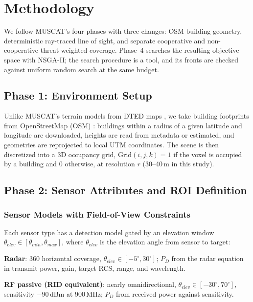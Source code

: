 
\section{Methodology}
\label{sec:methodology}

We follow MUSCAT's four phases \cite{muscat2023} with three changes: OSM building geometry, deterministic ray-traced line of sight, and separate cooperative and non-cooperative threat-weighted coverage. Phase~4 searches the resulting objective space with NSGA-II; the search procedure is a tool, and its fronts are checked against uniform random search at the same budget.

\subsection{Phase 1: Environment Setup}

Unlike MUSCAT's terrain models from DTED maps \cite{muscat2023}, we take building footprints from OpenStreetMap (OSM) \cite{osm_applications,elias2023exploring}: buildings within a radius of a given latitude and longitude are downloaded, heights are read from metadata or estimated, and geometries are reprojected to local UTM coordinates. The scene is then discretized into a 3D occupancy grid, \(\text{Grid}(i,j,k)=1\) if the voxel is occupied by a building and 0 otherwise, at resolution \(r\) (30--40\,m in this study).

\subsection{Phase 2: Sensor Attributes and ROI Definition}

\subsubsection{Sensor Models with Field-of-View Constraints}

Each sensor type has a detection model gated by an elevation window \(\theta_{elev}\in[\theta_{min},\theta_{max}]\), where \(\theta_{elev}\) is the elevation angle from sensor to target:

\textbf{Radar}: 360\textdegree{} horizontal coverage, $\theta_{elev} \in [-5^{\circ}, 30^{\circ}]$; \(P_D\) from the radar equation in transmit power, gain, target RCS, range, and wavelength.

\textbf{RF passive (RID equivalent)}: nearly omnidirectional, $\theta_{elev} \in [-30^{\circ}, 70^{\circ}]$, sensitivity \(-90\)\,dBm at 900\,MHz; \(P_D\) from received power against sensitivity.

